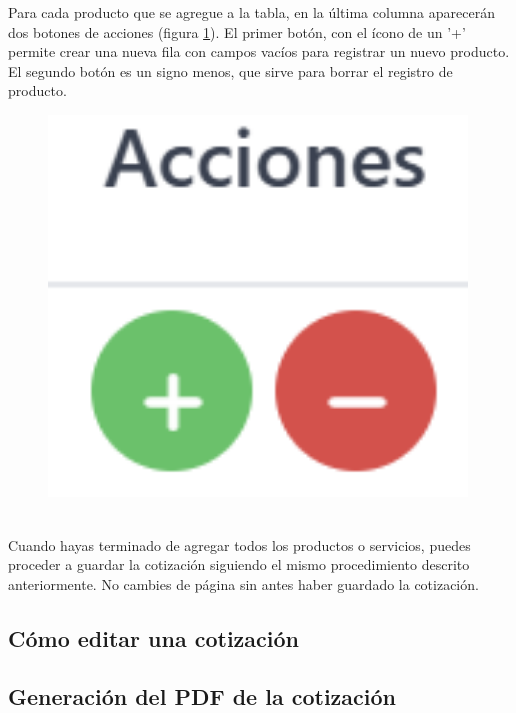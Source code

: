 \documentclass{Pretexto/bluereport}
\begin{document}
\begin{minipage}{0.78\linewidth}
    Para cada producto que se agregue a la tabla, en la última columna aparecerán dos botones de acciones
    (figura \ref{fig:icono_acciones}). El primer botón, con el ícono de un '+' permite crear una nueva
    fila con campos vacíos para registrar un nuevo producto. El segundo botón es un signo menos, que sirve 
    para borrar el registro de producto.
\end{minipage}
\hfil   
\begin{minipage}{0.08\linewidth}
    \begin{figure}[H]
        \centering
        \includegraphics[width=0.99\textwidth]{img/boton_acciones.png}
        \caption{}
        \label{fig:icono_acciones}
    \end{figure}
\end{minipage}
\vspace{0.5cm}
\\Cuando hayas terminado de agregar todos los productos o servicios, puedes proceder a guardar la cotización
 siguiendo el mismo procedimiento descrito anteriormente. No cambies de página sin antes haber guardado la cotización.
\subsection{Cómo editar una cotización}
\subsection{Generación del PDF de la cotización}
\end{document}
